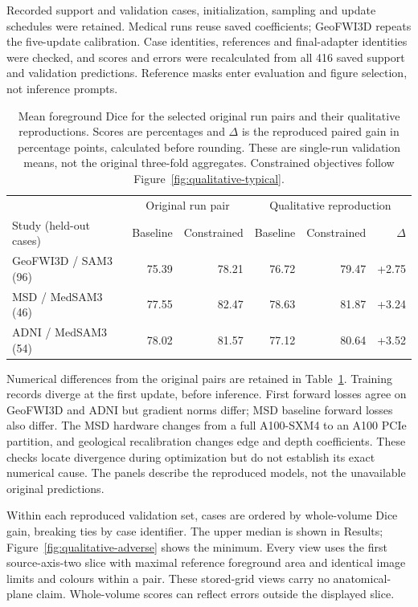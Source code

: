 \documentclass[12pt,a4paper]{article}
\begin{document}
Recorded support and validation cases, initialization, sampling and
update schedules were retained. Medical runs reuse saved coefficients;
GeoFWI3D repeats the five-update calibration. Case identities, references
and final-adapter identities were checked, and scores and errors were
recalculated from all 416 saved support and validation predictions.
Reference masks enter evaluation and figure selection, not inference
prompts.

\begin{table}[htbp]
\centering\small{}
\renewcommand{\arraystretch}{1.2}
\begin{tabular}{@{}lrrrrr@{}}
\hline
& \multicolumn{2}{c}{Original run pair} &
\multicolumn{3}{c}{Qualitative reproduction} \\
Study (held-out cases) & Baseline & Constrained & Baseline & Constrained & $\Delta$ \\
\hline
GeoFWI3D / SAM3 (96) & 75.39 & 78.21 & 76.72 & 79.47 & +2.75 \\
MSD / MedSAM3 (46) & 77.55 & 82.47 & 78.63 & 81.87 & +3.24 \\
ADNI / MedSAM3 (54) & 78.02 & 81.57 & 77.12 & 80.64 & +3.52 \\
\hline
\end{tabular}
\caption{Mean foreground Dice for the selected original run pairs and
their qualitative reproductions. Scores are percentages and $\Delta$ is
the reproduced paired gain in percentage points, calculated before
rounding. These are single-run validation means, not the original
three-fold aggregates. Constrained objectives follow
Figure~\ref{fig:qualitative-typical}.}
\label{tab:qualitative-reproduction-scores}
\end{table}

Numerical differences from the original pairs are retained in
Table~\ref{tab:qualitative-reproduction-scores}. Training records diverge
at the first update, before inference. First forward losses agree on
GeoFWI3D and ADNI but gradient norms differ; MSD baseline forward losses
also differ. The MSD hardware changes from a full A100-SXM4 to an A100
PCIe partition, and geological recalibration changes edge and depth
coefficients. These checks locate divergence during optimization but
do not establish its exact numerical cause. The panels describe the
reproduced models, not the unavailable original predictions.

Within each reproduced validation set, cases are ordered by whole-volume
Dice gain, breaking ties by case identifier. The upper median is shown
in Results; Figure~\ref{fig:qualitative-adverse} shows the minimum.
Every view uses the first source-axis-two slice with maximal reference
foreground area and identical image limits and colours within a pair.
These stored-grid views carry no anatomical-plane claim. Whole-volume
scores can reflect errors outside the displayed slice.
\end{document}
